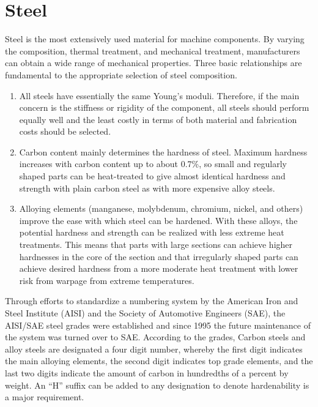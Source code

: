 \documentclass[
10pt,
a4paper,
openany,
svgnames,
]{book}
\begin{document}
\section{Steel}

Steel is the most extensively used material for machine components. By varying the composition, thermal treatment, and mechanical treatment, manufacturers can obtain a wide range of mechanical properties. Three basic relationships are fundamental to the appropriate selection of steel composition.

\begin{enumerate}
\item All steels have essentially the same Young’s moduli. Therefore, if the main concern is the stiffness or rigidity of the component, all steels should perform equally well and the least costly in terms of both material and fabrication costs should be selected.
\item Carbon content mainly determines the hardness of steel. Maximum hardness increases with carbon content up to about 0.7\%, so small and regularly shaped parts can be heat-treated to give almost identical hardness and strength with plain carbon steel as with more expensive alloy steels.
\item Alloying elements (manganese, molybdenum, chromium, nickel, and others) improve the ease with which steel can be hardened. With these alloys, the potential hardness and strength can be realized with less extreme heat treatments. This means that parts with large sections can achieve higher hardnesses in the core of the section and that irregularly shaped parts can achieve desired hardness from a more moderate heat treatment with lower risk from warpage from extreme temperatures.
\end{enumerate}

Through efforts to standardize a numbering system by the American Iron and Steel Institute (AISI) and the Society of Automotive Engineers (SAE), the AISI/SAE steel grades were established and since 1995 the future maintenance of the system was turned over to SAE. According to the grades, Carbon steels and alloy steels are designated a four digit number, whereby the first digit indicates the main alloying elements, the second digit indicates top grade elements, and the last two digits indicate the amount of carbon in hundredths of a percent by weight. An ``H'' suffix can be added to any designation to denote hardenability is a major requirement.
\end{document}
